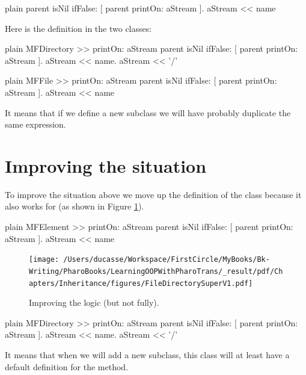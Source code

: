 \documentclass[10pt,twoside,english]{_support/latex/sbabook/sbabook}
\begin{document}
\begin{displaycode}{plain}
parent isNil 
	ifFalse: [ parent printOn: aStream ].
aStream << name
\end{displaycode}

Here is the definition in the two classes: 

\begin{displaycode}{plain}
MFDirectory >> printOn: aStream
	parent isNil 
		ifFalse: [ parent printOn: aStream ].
	aStream << name.
	aStream << '/'
\end{displaycode}

\begin{displaycode}{plain}
MFFile >> printOn: aStream
	parent isNil 
		ifFalse: [ parent printOn: aStream ].
	aStream << name
\end{displaycode}

It means that if we define a new subclass we will have probably duplicate the same expression.
\section{Improving the situation}
To improve the situation above we move up the definition of the  class because it also works for  (as shown in Figure \ref{fig:FileDirectorySuperV1}).

\begin{displaycode}{plain}
MFElement >> printOn: aStream
	parent isNil 
		ifFalse: [ parent printOn: aStream ].
	aStream << name
\end{displaycode}


\begin{figure}

\begin{center}
\texttt{[image: /Users/ducasse/Workspace/FirstCircle/MyBooks/Bk-Writing/PharoBooks/LearningOOPWithPharoTrans/\_result/pdf/Chapters/Inheritance/figures/FileDirectorySuperV1.pdf]}\caption{Improving the logic (but not fully).\label{fig:FileDirectorySuperV1}}\end{center}
\end{figure}


\begin{displaycode}{plain}
MFDirectory >> printOn: aStream
	parent isNil 
		ifFalse: [ parent printOn: aStream ].
	aStream << name.
	aStream << '/'
\end{displaycode}

It means that when we will add a new subclass, this class will at least have a default definition for the  method. 
\end{document}
